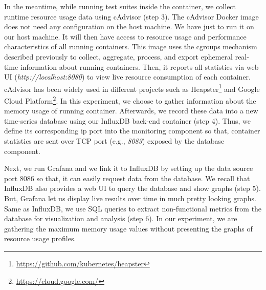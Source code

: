 In the meantime, while running test suites inside the container, we collect runtime resource usage data using cAdvisor (step 3). The cAdvisor Docker image does not need any configuration on the host machine. We have just to run it on our host machine. It will then have access to resource usage and performance characteristics of all running containers. This image uses the cgroups mechanism described previously to collect, aggregate, process, and export ephemeral real-time information about running containers. Then, it reports all statistics via web UI (\textit{http://localhost:8080}) to view live resource consumption of each container. cAdvisor has been widely used in different projects such as Heapster\footnote{\url{https://github.com/kubernetes/heapster}} and Google Cloud Platform\footnote{\url{https://cloud.google.com/}}. In this experiment, we choose to gather information about the memory usage of running container.
Afterwards, we record these data into a new time-series database using our InfluxDB back-end container (step 4). Thus, we define its corresponding ip port into the monitoring component so that, container statistics are sent over TCP port (e.g., \textit{8083}) exposed by the database component. 

Next, we run Grafana and we link it to InfluxDB by setting up the data source port 8086 so that, it can easily request data from the database. We recall that InfluxDB also provides a web UI to query the database and show graphs (step 5). But, Grafana let us display live results over time in much pretty looking graphs. Same as InfluxDB, we use SQL queries to extract non-functional metrics from the database for visualization and analysis (step 6). In our experiment, we are gathering the maximum memory usage values without presenting the graphs of resource usage profiles.
 
 

